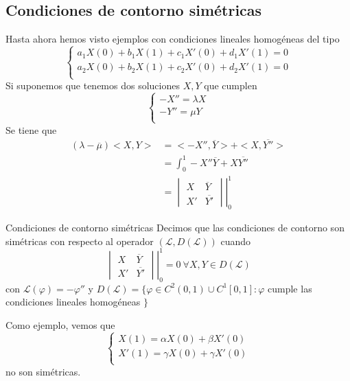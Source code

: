 \subsection{Condiciones de contorno simétricas}
Hasta ahora hemos visto ejemplos con condiciones lineales homogéneas del tipo
\begin{equation*}
\left\{
\begin{array}{l}
a_1X(0)+b_1X(1)+c_1X'(0)+d_1X'(1) = 0\\
a_2X(0)+b_2X(1)+c_2X'(0)+d_2X'(1) = 0\\
\end{array}
\right.
\end{equation*}
Si suponemos que tenemos dos soluciones $X,Y$ que cumplen
\begin{equation*}
\left\{
\begin{array}{l}
-X''=\lambda X\\
-Y''=\mu Y\\
\end{array}
\right.
\end{equation*}
Se tiene que
\begin{align*}
(\lambda-\overline{\mu})<X,Y> & = <-X'',\overline{Y}>+<X,\overline{Y''}> \\
& = \int_0^1-X''\overline{Y}+X\overline{Y''}\\
& = 
\left.\begin{vmatrix}
X & \overline{Y}\\
X' & \overline{Y'}
\end{vmatrix}\right|_0^1
\end{align*}

\begin{definition}{Condiciones de contorno simétricas}
Decimos que las condiciones de contorno son simétricas con respecto al operador $(\mathcal{L}, D(\mathcal{L}))$ cuando $$\left.\begin{vmatrix}
X & \overline{Y}\\
X' & \overline{Y'}
\end{vmatrix}\right|_0^1 = 0 \ \forall X,Y\in D(\mathcal{L})$$
con $\mathcal{L}(\varphi)=-\varphi''$ y $D(\mathcal{L})=\{\varphi\in C^2(0,1)\cup C^1[0,1]: \varphi$ cumple las condiciones lineales homogéneas $\}$
\end{definition}
Como ejemplo, vemos que 
\begin{equation*}
\left\{
\begin{array}{l}
X(1) = \alpha X(0)+\beta X'(0)\\
X'(1) = \gamma X(0)+\gamma X'(0)\\
\end{array}
\right.
\end{equation*}
no son simétricas.

